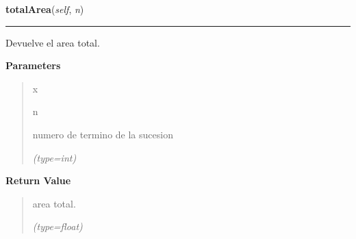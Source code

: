 \hspace{.8\funcindent}\begin{boxedminipage}{\funcwidth}

    \raggedright \textbf{totalArea}(\textit{self}, \textit{n})

    \vspace{-1.5ex}

    \rule{\textwidth}{0.5\fboxrule}
\setlength{\parskip}{2ex}
    Devuelve el area total.

\setlength{\parskip}{1ex}
      \textbf{Parameters}
      \vspace{-1ex}

      \begin{quote}
        \begin{Ventry}{x}

          \item[n]

          numero de termino de la sucesion

            {\it (type=int)}

        \end{Ventry}

      \end{quote}

      \textbf{Return Value}
    \vspace{-1ex}

      \begin{quote}
      area total.

      {\it (type=float)}

      \end{quote}

    \end{boxedminipage}

    \label{FractalZE:sierpinsky:Sierpinsky:trianglePerimeter}

    \vspace{0.5ex}

